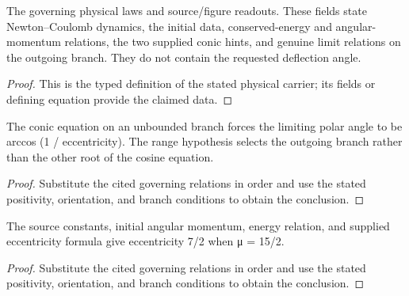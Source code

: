 \begin{definition}
  \label{def:physics:IPhO_2026_1_B_2:aux026}
  The governing physical laws and source/figure readouts. These fields state Newton--Coulomb dynamics, the initial data, conserved-energy and angular-momentum relations, the two supplied conic hints, and genuine limit relations on the outgoing branch. They do not contain the requested deflection angle.
\end{definition}
\begin{proof}
  This is the typed definition of the stated physical carrier; its fields or defining equation provide the claimed data.
\end{proof}

\begin{lemma}
  \label{lem:physics:IPhO_2026_1_B_2:aux027}
  The conic equation on an unbounded branch forces the limiting polar angle to be arccos (1 / eccentricity). The range hypothesis selects the outgoing branch rather than the other root of the cosine equation.
\end{lemma}
\begin{proof}
  Substitute the cited governing relations in order and use the stated positivity, orientation, and branch conditions to obtain the conclusion.
\end{proof}

\begin{lemma}
  \label{lem:physics:IPhO_2026_1_B_2:aux028}
  The source constants, initial angular momentum, energy relation, and supplied eccentricity formula give eccentricity 7/2 when μ = 15/2.
\end{lemma}
\begin{proof}
  Substitute the cited governing relations in order and use the stated positivity, orientation, and branch conditions to obtain the conclusion.
\end{proof}

